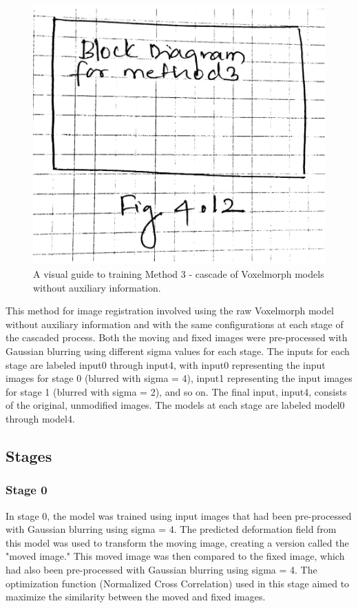 \documentclass{report}
\begin{document}
	\begin{figure}[h!]
		\centering
		\includegraphics[width=0.6\columnwidth]{resources/chapter4/block_diagram_method_3.png}
		\caption{A visual guide to training Method 3 - cascade of Voxelmorph models without auxiliary information.}
		\label{fig:block_method3}
	\end{figure}

	
	This method for image registration involved using the raw Voxelmorph model without auxiliary information and with the same configurations at each stage of the cascaded process. Both the moving and fixed images were pre-processed with Gaussian blurring using different sigma values for each stage. The inputs for each stage are labeled input0 through input4, with input0 representing the input images for stage 0 (blurred with sigma = 4), input1 representing the input images for stage 1 (blurred with sigma = 2), and so on. The final input, input4, consists of the original, unmodified images. The models at each stage are labeled model0 through model4.
	
	\subsection{Stages}
	
	\subsubsection{Stage 0}
	In stage 0, the model was trained using input images that had been pre-processed with Gaussian blurring using sigma = 4. The predicted deformation field from this model was used to transform the moving image, creating a version called the "moved image." This moved image was then compared to the fixed image, which had also been pre-processed with Gaussian blurring using sigma = 4. The optimization function (Normalized Cross Correlation) used in this stage aimed to maximize the similarity between the moved and fixed images.
	
\end{document}
